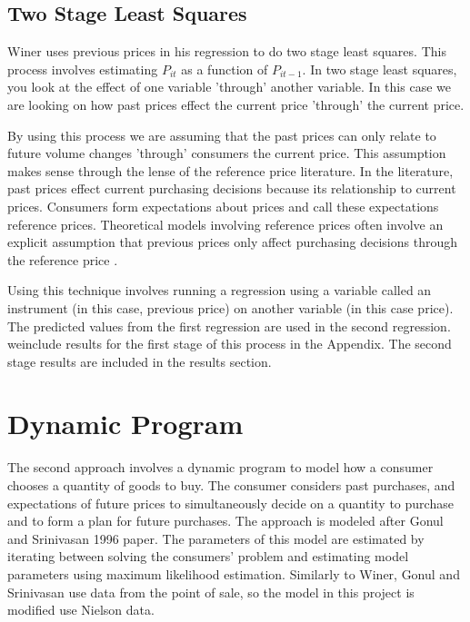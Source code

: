 \documentclass{article}
\begin{document}
\subsection{Two Stage Least Squares}

Winer uses previous prices in his regression to do two stage least squares. This process involves estimating ${P}_{it}$ as a function of ${P}_{it-1}$. In two stage least squares, you look at the effect of one variable 'through' another variable.  In this case we are looking on how past prices effect the current price 'through' the current price. 

By using this process we are assuming that the past prices can only relate to future volume changes 'through' consumers the current price. This assumption makes sense through the lense of the reference price literature. In the literature, past prices effect current purchasing decisions because its relationship to current prices. Consumers form expectations about prices and call these expectations reference prices. Theoretical models involving reference prices often involve an explicit assumption that previous prices only affect purchasing decisions through the reference price \cite{putler}.

Using this technique involves running a regression using a variable called an instrument (in this case, previous price) on another variable (in this case price). The predicted values from the first regression are used in the second regression. weinclude results for the first stage of this process in the Appendix. The second stage results are included in the results section.\\


\section{Dynamic Program}


The second approach involves a dynamic program to model how a consumer chooses a quantity of goods to buy. The consumer considers past purchases, and expectations of future prices to simultaneously decide on a quantity to purchase and to form a plan for future purchases. The approach is modeled after Gonul and Srinivasan 1996 paper\cite{gonul}. The parameters of this model are estimated by iterating between solving the consumers' problem and estimating model parameters using maximum likelihood estimation. Similarly to Winer, Gonul and Srinivasan use data from the point of sale, so the model in this project is modified use Nielson data.
\end{document}
